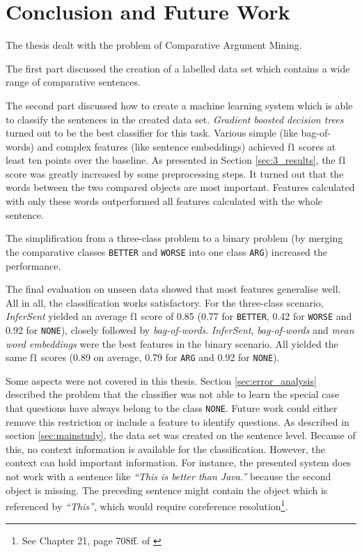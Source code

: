 \chapter{Conclusion and Future Work}
The thesis dealt with the problem of Comparative Argument Mining. 

The first part discussed the creation of a labelled data set which contains a wide range of comparative sentences.

The second part discussed how to create a machine learning system which is able to classify the sentences in the created data set. \emph{Gradient boosted decision trees} turned out to be the best classifier for this task. Various simple (like bag-of-words) and complex features (like sentence embeddings) achieved f1 scores at least ten points over the baseline. As presented in Section \ref{sec:3_results}, the f1 score was greatly increased by some preprocessing steps. It turned out that the words between the two compared objects are most important. Features calculated with only these words outperformed all features calculated with the whole sentence.

The simplification from a three-class problem to a binary problem (by merging the comparative classes \texttt{BETTER} and \texttt{WORSE} into one class \texttt{ARG}) increased the performance.

The final evaluation on unseen data showed that most features generalise well. All in all, the classification works satisfactory. For the three-class scenario, \emph{InferSent}  yielded an average f1 score of 0.85 (0.77 for \texttt{BETTER}, 0.42 for \texttt{WORSE} and 0.92 for \texttt{NONE}), closely followed by \emph{bag-of-words}. \emph{InferSent}, \emph{bag-of-words} and \emph{mean word embeddings} were the best features in the binary scenario. All yielded the same f1 scores (0.89 on average, 0.79 for \texttt{ARG} and 0.92 for \texttt{NONE}).
\newline


Some aspects were not covered in this thesis. Section \ref{sec:error_analysis} described the problem that the classifier was not able to learn the special case that questions have always belong to the class \texttt{NONE}. Future work could either remove this restriction or include a feature to identify questions. As described in section \ref{sec:mainstudy}, the data set was created on the sentence level. Because of this, no context information is available for the classification. However, the context can hold important information. For instance, the presented system does not work with a sentence like \emph{\enquote{This is better than Java.}} because the second object is missing. The preceding sentence might contain the object which is referenced by \emph{\enquote{This}}, which would require coreference resolution\footnote{See Chapter 21, page 708ff. of \cite{martin2009speech}}.

